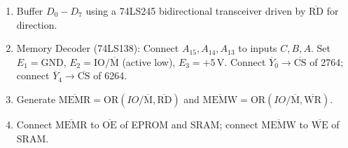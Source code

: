 \documentclass[12pt,a4paper]{article}
\begin{document}
\begin{tcolorbox}[examplebox, title={Complete 8085 Microprocessor System Interfacing Design}, breakable]
\begin{enumerate}[leftmargin=*]
  \item Buffer $D_0-D_7$ using a 74LS245 bidirectional transceiver driven by $\overline{\mathrm{RD}}$ for direction.
  \item Memory Decoder (74LS138): Connect $A_{15}, A_{14}, A_{13}$ to inputs $C, B, A$. Set $E_1 = \mathrm{GND}$, $E_2 = \mathrm{IO}/\overline{\mathrm{M}}$ (active low), $E_3 = +5\,\mathrm{V}$. Connect $\overline{Y}_0 \to \overline{\mathrm{CS}}$ of 2764; connect $\overline{Y}_4 \to \overline{\mathrm{CS}}$ of 6264.
  \item Generate $\overline{\mathrm{MEMR}} = \mathrm{OR}(IO/\overline{\mathrm{M}}, \overline{\mathrm{RD}})$ and $\overline{\mathrm{MEMW}} = \mathrm{OR}(IO/\overline{\mathrm{M}}, \overline{\mathrm{WR}})$.
  \item Connect $\overline{\mathrm{MEMR}}$ to $\overline{\mathrm{OE}}$ of EPROM and SRAM; connect $\overline{\mathrm{MEMW}}$ to $\overline{\mathrm{WE}}$ of SRAM.
\end{enumerate}
\end{tcolorbox}
\end{document}
